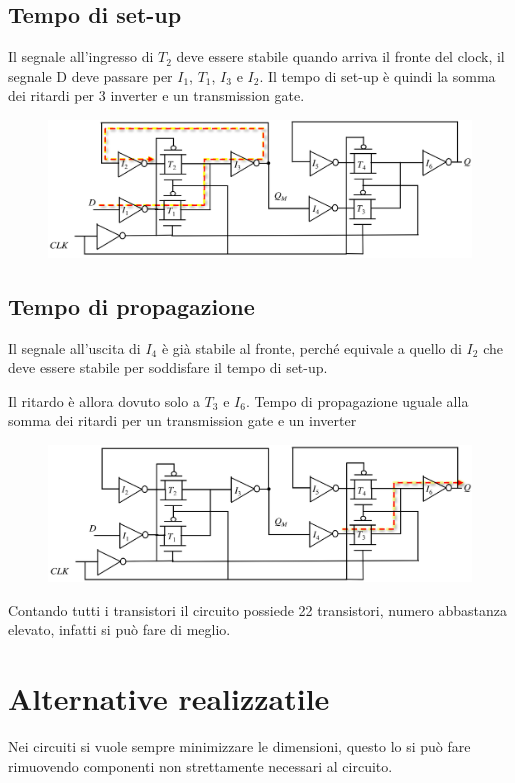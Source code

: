\subsection{Tempo di set-up}

Il segnale all'ingresso di $T_2$ deve essere stabile quando arriva il fronte del clock, il segnale D deve passare per $I_1$, $T_1$, $I_3$ e $I_2$. Il tempo di set-up è quindi la somma dei ritardi per 3 inverter e un transmission gate.


\begin{figure}[htbp]
    \centering
    \includegraphics[width=0.6\linewidth]{img/set_up.png}
\end{figure}

\subsection{Tempo di propagazione}

Il segnale all'uscita di $I_4$ è già stabile al fronte, perché
equivale a quello di $I_2$
che deve essere stabile per
soddisfare il tempo di set-up.

Il ritardo è allora dovuto solo a $T_3$ e $I_6$. Tempo di propagazione uguale alla somma dei ritardi per un
transmission gate e un inverter


\begin{figure}[htbp]
    \centering
    \includegraphics[width=0.63\linewidth]{img/prop.png}
\end{figure}

Contando tutti i transistori il circuito possiede 22 transistori, numero abbastanza elevato, infatti si può fare di meglio.

\newpage
\section{Alternative realizzatile}

Nei circuiti si vuole sempre minimizzare le dimensioni, questo lo si può fare rimuovendo componenti non strettamente necessari al circuito. 

